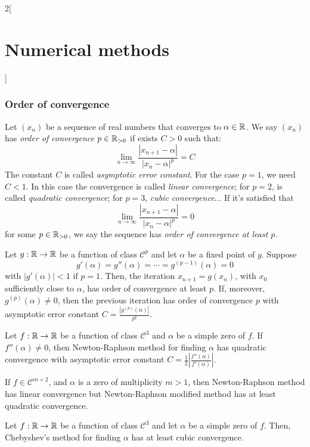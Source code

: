 \documentclass[../../../main_math.tex]{subfiles}
\begin{document}
\begin{multicols}{2}[\section{Numerical methods}]
  \subsubsection{Order of convergence}
  \begin{definition}
    Let $(x_n)$ be a sequence of real numbers that converges to $\alpha\in\mathbb{R}$. We say $(x_n)$ has \emph{order of convergence} $p\in\mathbb{R}_{>0}$ if exists $C>0$ such that: $$\lim_{n\to\infty}\frac{|x_{n+1}-\alpha|}{|x_n-\alpha|^p}=C$$ The constant $C$ is called \emph{asymptotic error constant}. For the case $p=1$, we need $C<1$. In this case the convergence is called \emph{linear convergence}; for $p=2$, is called \emph{quadratic convergence}; for $p=3$, \emph{cubic convergence}... If it's satisfied that $$\lim_{n\to\infty}\frac{|x_{n+1}-\alpha|}{|x_n-\alpha|^p}=0$$ for some $p\in\mathbb{R}_{>0}$, we say the sequence has \emph{order of convergence at least $p$}.
  \end{definition}
  \begin{theorem}
    Let $g:\mathbb{R}\rightarrow\mathbb{R}$ be a function of class $\mathcal{C}^p$ and let $\alpha$ be a fixed point of $g$. Suppose $$g'(\alpha)=g''(\alpha)=\cdots=g^{(p-1)}(\alpha)=0$$ with $|g'(\alpha)|<1$ if $p=1$. Then, the iteration $x_{n+1}=g(x_n)$, with $x_0$ sufficiently close to $\alpha$, has order of convergence at least $p$. If, moreover, $g^{(p)}(\alpha)\ne0$, then the previous iteration has order of convergence $p$ with asymptotic error constant $C=\frac{|g^{(p)}(\alpha)|}{p!}$.
  \end{theorem}
  \begin{theorem}
    Let $f:\mathbb{R}\rightarrow\mathbb{R}$ be a function of class $\mathcal{C}^3$ and $\alpha$ be a simple zero of $f$. If $f''(\alpha)\ne0$, then Newton-Raphson method for finding $\alpha$ has quadratic convergence with asymptotic error constant $C=\frac{1}{2}\left|\frac{f''(\alpha)}{f'(\alpha)}\right|$.\par If $f\in\mathcal{C}^{m+2}$, and $\alpha$ is a zero of multiplicity $m>1$, then Newton-Raphson method has linear convergence but Newton-Raphson modified method has at least quadratic convergence.
  \end{theorem}
  \begin{theorem}
    Let $f:\mathbb{R}\rightarrow\mathbb{R}$ be a function of class $\mathcal{C}^3$ and let $\alpha$ be a simple zero of $f$. Then, Chebyshev's method for finding $\alpha$ has at least cubic convergence.
  \end{theorem}
  \begin{definition}

\end{definition}
\end{multicols}
\end{document}
